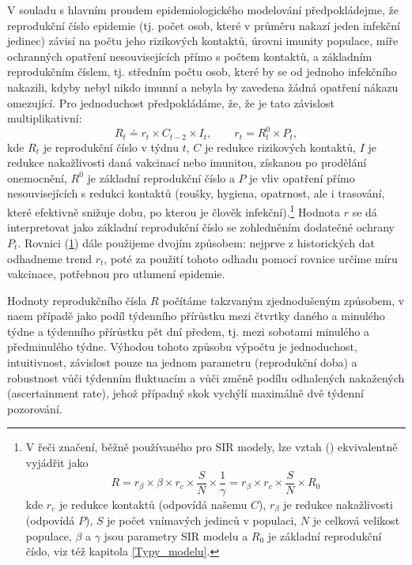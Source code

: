 V souladu s hlavním proudem epidemiologického modelování předpokládejme, že reprodukční číslo epidemie (tj. 
počet osob, které v průměru nakazí jeden infekční jedinec) závisí na počtu jeho
rizikových kontaktů, úrovni imunity populace, míře ochranných opatření
nesouvisejících přímo s počtem kontaktů, a základním reprodukčním
číslem, tj. středním počtu osob, které by se od jednoho infekčního nakazili, kdyby nebyl
nikdo imunní a nebyla by zavedena žádná opatření nákazu omezující. Pro jednoduchost
předpokládáme, že, že je tato závislost multiplikativní: 
\begin{equation}
R_{t}\doteq r_{t}\times C_{t-2}\times I_{t},\qquad r_{t}=R_{t}^{0}\times P_{t},
\label{eq:r}
\end{equation}
kde $R_{t}$ je reprodukční číslo v týdnu $t$, $C$ je redukce rizikových kontaktů,
$I$ je redukce nakažlivosti daná vakcinací nebo imunitou, získanou
po prodělání onemocnění, $R^{0}$ je základní reprodukční číslo a
$P$ je vliv opatření přímo nesouvisejících s redukci kontaktů (roušky, hygiena, opatrnost, ale i trasování, které efektivně snižuje dobu, po kterou je člověk infekční).\footnote{V řeči značení, běžně používaného pro SIR modely, lze vztah (\label{eq:r}) ekvivalentně vyjádřit jako 
$$ 
R = r_\beta \times \beta \times r_c \times \frac{S}{N} \times \frac{1}\gamma = r_\beta \times r_c \times \frac{S}{N} \times R_0
$$
kde $r_c$ je redukce kontaktů (odpovídá našemu $C$), $r_\beta$ je redukce nakažlivosti (odpovídá $P$), $S$ je počet vnímavých jedinců v populaci, $N$ je celková velikost populace, $\beta$ a $\gamma$ jsou parametry SIR modelu a $R_0$ je základní reprodukční číslo, viz též kapitola \ref{Typy_modelu}.} Hodnota $r$ se dá interpretovat jako základní reprodukční
číslo se zohledněním dodatečné ochrany $P_{t}$. Rovnici (\ref{eq:r}) dále použijeme dvojím způsobem: nejprve z historických dat odhadneme trend $r_t$, poté za použití tohoto odhadu pomocí rovnice určíme míru vakcinace, potřebnou pro utlumení epidemie.

Hodnoty reprodukčního čísla $R$ počítáme takzvaným zjednodušeným způsobem, v naem případě jako podíl týdenního přírůstku mezi čtvrtky daného a minulého týdne a týdenního přírůstku pět dní předem,
tj. mezi sobotami minulého a předminulého týdne. Výhodou tohoto způsobu výpočtu je jednoduchost, intuitivnost, závislost pouze na jednom parametru (reprodukční doba) a robustnost vůči týdenním fluktuacím a vůči změně podílu
odhalených nakažených (ascertainment rate), jehož případný skok vychýlí
maximálně dvě týdenní pozorování.

